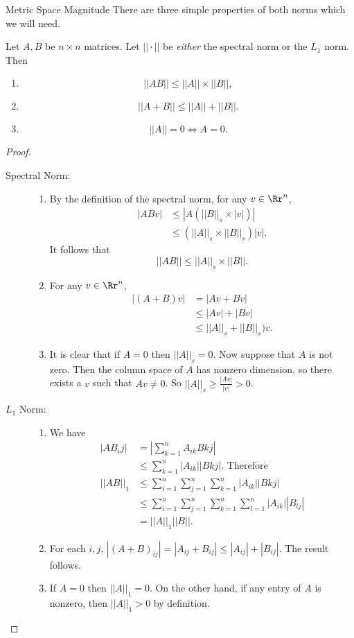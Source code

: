 \documentclass[12pt]{pom_thesis}
\begin{document}
\begin{chapter}{Metric Space Magnitude}
There are three simple properties of both norms which we will need.
\begin{lemma}\label{lem:norm_prop}
Let $A, B$ be $n \times n$ matrices. Let $||\cdot||$ be \emph{either} the spectral norm or the $L_1$ norm. Then
\begin{enumerate}
\item \[
||AB|| \leq ||A||\times ||B||,
\]

\item
\[
||A + B|| \leq ||A|| + ||B||.
\]
\item 
\[
||A|| = 0 \iff A = 0.
\]
\end{enumerate}
\end{lemma}
\begin{proof}
\begin{description}
\item[Spectral Norm:]
\begin{enumerate}
\item By the definition of the spectral norm, for any $v \in \Rr^n$,
\begin{align*}
|ABv| &\leq |A(||B||_s \times |v|)|\\
&\leq (||A||_s \times ||B||_s)|v|.
\end{align*}
It follows that 
 \[
||AB|| \leq ||A||_s\times ||B||.
\]
\item For any $v \in \Rr^n$,
\begin{align*}
|(A + B)v| &= |Av + Bv|\\
 &\leq |Av| + |Bv|\\
 &\leq ||A||_s + ||B||_s)v.
\end{align*}
\item It is clear that if $A=0$ then $||A||_s=0$. Now suppose that $A$ is not zero. Then the column space of $A$ has nonzero dimension, so there exists a $v$ such that $Av \neq 0$. So $||A||_s \geq \frac{|Av|}{|v|} > 0$.
\end{enumerate}
\item[$L_1$ Norm:]
\begin{enumerate}
\item We have
\begin{align*}
|AB_ij| &= \left| \sum_{k = 1}^nA_{ik}B{kj}\right|\\
&\leq \sum_{k = 1}^n|A_{ik}||B{kj}|. \text{ Therefore}\\
||AB||_1 &\leq \sum_{i = 1}^n\sum_{j=1}^n\sum_{k=1}^n|A_{ik}||B{kj}|\\
&\leq \sum_{i = 1}^n\sum_{j=1}^n\sum_{k=1}^n\sum_{l=1}^n|A_{ik}||B_{lj}|\\
&= ||A||_1||B||.
\end{align*}
\item For each $i,j$, $|(A + B)_{ij}| = |A_{ij} + B_{ij}| \leq |A_{ij}| + |B_{ij}|$. The result follows.
\item If $A=0$ then $||A||_1=0$. On the other hand, if any entry of $A$ is nonzero, then $||A||_1 > 0$ by definition.
\end{enumerate}
\end{description}
\end{proof}






\end{chapter}
\end{document}
